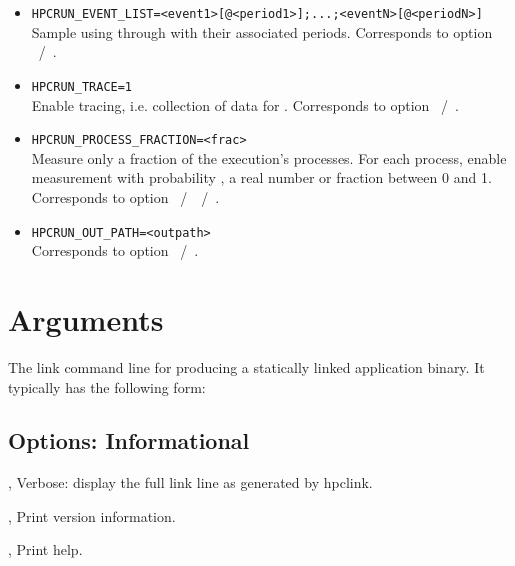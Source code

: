 \documentclass[english]{article}
\begin{document}
\begin{itemize}
\item \verb+HPCRUN_EVENT_LIST=<event1>[@<period1>];...;<eventN>[@<periodN>]+\\
  Sample using  through  with their associated periods.
  Corresponds to  option ~/~.

\item \verb+HPCRUN_TRACE=1+\\
  Enable tracing, i.e. collection of data for .
  Corresponds to  option ~/~.

\item \verb+HPCRUN_PROCESS_FRACTION=<frac>+\\
  Measure only a fraction  of the execution's processes.
  For each process, enable measurement with probability ,
  a real number or fraction between 0 and 1.
  Corresponds to  option ~/~~/~.

\item \verb+HPCRUN_OUT_PATH=<outpath>+\\
  Corresponds to  option ~/~.

\end{itemize}



\section{Arguments}

\begin{Description}
\item[\Arg{link-command}] The link command line for producing a statically linked application binary.
It typically has the following form:\\
\SP\SP\SP {}   
\end{Description}


\subsection{Options: Informational}

\begin{Description}

\item[\Opt{-v}, \Opt{--verbose}]
Verbose: display the full link line as generated by hpclink.

\item[\Opt{-V}, \Opt{--version}]
Print version information.

\item[\Opt{-h}, \Opt{--help}]
Print help.

\end{Description}
\end{document}
